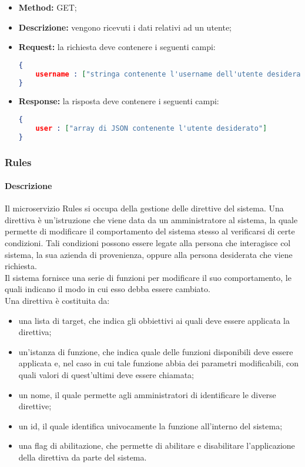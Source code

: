 \begin{itemize}
\begin{itemize}
\item \textbf{Method:} GET;
\item \textbf{Descrizione:} vengono ricevuti i dati relativi ad un utente; 
\item \textbf{Request:} la richiesta deve contenere i seguenti campi:
\begin{lstlisting}[language=json,firstnumber=1]
{
	username : ["stringa contenente l'username dell'utente desiderato"]
}
\end{lstlisting}

\item \textbf{Response:} la risposta deve contenere i seguenti campi:
\begin{lstlisting}[language=json,firstnumber=1]
{
	user : ["array di JSON contenente l'utente desiderato"]
}
\end{lstlisting}
\end{itemize}

\end{itemize}

\subsubsection{Rules}
\paragraph{Descrizione}
Il microservizio Rules si occupa della gestione delle direttive del sistema. Una direttiva è un'istruzione che viene data da un amministratore al sistema, la quale permette di modificare il comportamento del sistema stesso al verificarsi di certe condizioni. Tali condizioni possono essere legate alla persona che interagisce col sistema, la sua azienda di provenienza, oppure alla persona desiderata che viene richiesta.\\
Il sistema fornisce una serie di funzioni per modificare il suo comportamento, le quali indicano il modo in cui esso debba essere cambiato. \\
Una direttiva è costituita da:
\begin{itemize}
	\item una lista di target, che indica gli obbiettivi ai quali deve essere applicata la direttiva;
	\item un'istanza di funzione, che indica quale delle funzioni disponibili deve essere applicata e, nel caso in cui tale funzione abbia dei parametri modificabili, con quali valori di quest'ultimi deve essere chiamata;
	\item un nome, il quale permette agli amministratori di identificare le diverse direttive;
	\item un id, il quale identifica univocamente la funzione all'interno del sistema; 
	\item una flag di abilitazione, che permette di abilitare e disabilitare l'applicazione della direttiva da parte del sistema.
\end{itemize}
  
